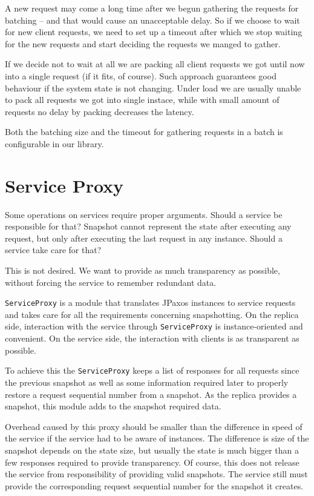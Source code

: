 A new request may come a long time after we begun gathering the requests for batching -- and that would cause an unacceptable delay. So if we choose to wait for new client requests, we need to set up a timeout after which we stop waiting for the new requests and start deciding the requests we manged to gather.

If we decide not to wait at all we are packing all client requests we got until now into a single request (if it fits, of course). Such approach guarantees good behaviour if the system state is not changing. Under load  we are usually unable to pack all requests we got into single instace, while with small amount of requests no delay by packing decreases the latency.

Both the batching size and the timeout for gathering requests in a batch is configurable in our library.

\section{Service Proxy}
\label{sec:serviceProxy}

Some operations on services require proper arguments. Should a service be responsible for that? Snapshot cannot represent the state after executing any request, but only after executing the last request in any instance. Should a service take care for that?

This is not desired. We want to provide as much transparency as possible, without forcing the service to remember redundant data.

\texttt{ServiceProxy} is a module that translates JPaxos instances to service requests and takes care for all the requirements concerning snapshotting. On the replica side, interaction with the service through \texttt{ServiceProxy} is instance-oriented and convenient. On the service side, the interaction with clients is as transparent as possible.

To achieve this the \texttt{ServiceProxy} keeps a list of responses for all requests since the previous snapshot as well as some information required later to properly restore a
request sequential number %
from a snapshot.
As the replica provides a snapshot, this module adds to the snapshot required data.

Overhead caused by this proxy should be smaller than the difference in speed of the service if the service had to be aware of instances. The difference is size of the snapshot depends on the state size, but usually the state is much bigger than a few responses required to provide transparency.
Of course, this does not release the service from responsibility of providing valid snapshots. The service still must provide the corresponding 
request sequential number %
for the snapshot it creates.
